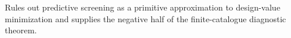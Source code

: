 Rules out predictive screening as a primitive approximation to design-value minimization and supplies the negative half of the finite-catalogue diagnostic theorem.